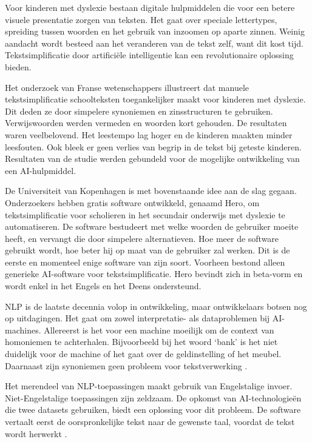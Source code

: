Voor kinderen met dyslexie bestaan digitale hulpmiddelen die voor een betere visuele presentatie zorgen van teksten. Het gaat over speciale lettertypes, spreiding tussen woorden en het gebruik van inzoomen op aparte zinnen. Weinig aandacht wordt besteed aan het veranderen van de tekst zelf, want dit kost tijd. Tekstsimplificatie door artificiële intelligentie kan een revolutionaire oplossing bieden. 

Het onderzoek van Franse wetenschappers \textcite{Gala2016} illustreert dat manuele tekstsimplificatie schoolteksten toegankelijker maakt voor kinderen met dyslexie. Dit deden ze door simpelere synoniemen en zinsstructuren te gebruiken. Verwijswoorden werden vermeden en woorden kort gehouden. De resultaten waren veelbelovend. Het leestempo lag hoger en de kinderen maakten minder leesfouten. Ook bleek er geen verlies van begrip in de tekst bij geteste kinderen. Resultaten van de studie werden gebundeld voor de mogelijke ontwikkeling van een AI-hulpmiddel.

De Universiteit van Kopenhagen is met bovenstaande idee aan de slag gegaan. Onderzoekers \textcite{Bingel2018} hebben gratis software ontwikkeld, genaamd Hero, om tekstsimplificatie voor scholieren in het secundair onderwijs met dyslexie te automatiseren. De software bestudeert met welke woorden de gebruiker moeite heeft, en vervangt die door simpelere alternatieven. Hoe meer de software gebruikt wordt, hoe beter hij op maat van de gebruiker zal werken. Dit is de eerste en momenteel enige software van zijn soort. Voorheen bestond alleen generieke AI-software voor tekstsimplificatie. Hero bevindt zich in beta-vorm en wordt enkel in het Engels en het Deens ondersteund. 

NLP is de laatste decennia volop in ontwikkeling, maar ontwikkelaars botsen nog op uitdagingen. Het gaat om zowel interpretatie- als dataproblemen bij AI-machines. Allereerst is het voor een machine moeilijk om de context van homoniemen te achterhalen. Bijvoorbeeld bij het woord ‘bank’ is het niet duidelijk voor de machine of het gaat over de geldinstelling of het meubel. Daarnaast zijn synoniemen geen probleem voor tekstverwerking \autocite{Roldos2020}.

Het merendeel van NLP-toepassingen maakt gebruik van Engelstalige invoer. Niet-Engelstalige toepassingen zijn zeldzaam. De opkomst van AI-technologieën die twee datasets gebruiken, biedt een oplossing voor dit probleem. De software vertaalt eerst de oorspronkelijke tekst naar de gewenste taal, voordat de tekst wordt herwerkt \autocite{Sciforce2020}.

